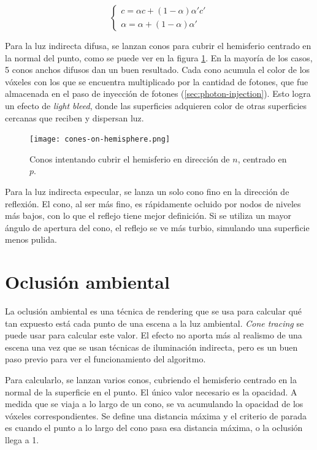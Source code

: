 $$
\begin{cases}
    c = \alpha c + (1 - \alpha) \alpha' c' \\
    \alpha = \alpha + (1 - \alpha) \alpha'
\end{cases}
$$

Para la luz indirecta difusa, se lanzan conos para cubrir el hemisferio centrado en la normal del punto, como se puede ver en la figura \ref{fig:cone-hemisphere}.
En la mayoría de los casos, 5 conos anchos difusos dan un buen resultado.
Cada cono acumula el color de los vóxeles con los que se encuentra multiplicado por la cantidad de fotones, que fue almacenada en el paso de inyección de fotones (\ref{sec:photon-injection}).
Esto logra un efecto de \textit{light bleed}, donde las superficies adquieren color de otras superficies cercanas que reciben y dispersan luz.

\begin{figure}[hb]
    \centering
    \texttt{[image: cones-on-hemisphere.png]}
    \caption{Conos intentando cubrir el hemisferio en dirección de $n$, centrado en $p$.}
    \label{fig:cone-hemisphere}
\end{figure}

Para la luz indirecta especular, se lanza un solo cono fino en la dirección de reflexión.
El cono, al ser más fino, es rápidamente ocluido por nodos de niveles más bajos, con lo que el reflejo tiene mejor definición.
Si se utiliza un mayor ángulo de apertura del cono, el reflejo se ve más turbio, simulando una superficie menos pulida.

\section{Oclusión ambiental}

La oclusión ambiental es una técnica de rendering que se usa para calcular qué tan expuesto está cada punto de una escena a la luz ambiental.
\textit{Cone tracing} se puede usar para calcular este valor.
El efecto no aporta más al realismo de una escena una vez que se usan técnicas de iluminación indirecta, pero es un buen paso previo para ver el funcionamiento del algoritmo.

Para calcularlo, se lanzan varios conos, cubriendo el hemisferio centrado en la normal de la superficie en el punto.
El único valor necesario es la opacidad.
A medida que se viaja a lo largo de un cono, se va acumulando la opacidad de los vóxeles correspondientes.
Se define una distancia máxima y el criterio de parada es cuando el punto a lo largo del cono pasa esa distancia máxima, o la oclusión llega a 1.

